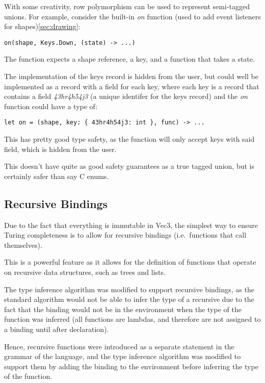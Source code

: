 With some creativity, row polymorphism can be used to represent semi-tagged unions.
For example, consider the built-in \textit{on} function (used to add event listeners for shapes)\ref{sec:drawing}:

\begin{verbatim}
on(shape, Keys.Down, (state) -> ...)
\end{verbatim}

The function expects a shape reference, a key, and a function that takes a state.

The implementation of the keys record is hidden from the user, but could well be implemented as a record with a field
for each key, where each key is a record that contains a field 
\textit{43hr4h54j3} (a unique identifer for the keys record) and the \textit{on} function could have a type of:
\begin{verbatim}
let on = (shape, key: { 43hr4h54j3: int }, func) -> ...
\end{verbatim}

This has pretty good type safety, as the function will only accept keys with said field, which is hidden from the user.

This doesn't have quite as good safety guarantees as a true tagged union, but is certainly safer than say C enums.

\subsection{Recursive Bindings}\label{subsec:recursive-bindings}

Due to the fact that everything is immutable in Vec3, the simplest way to ensure Turing completeness is to allow for 
recursive bindings (i.e.\ functions that call themselves).

This is a powerful feature as it allows for the definition of functions that operate on recursive data structures, such
as trees and lists.

The type inference algorithm was modified to support recursive bindings, as the standard algorithm would not be able to
infer the type of a recursive due to the fact that the binding would not be in the environment when the type of the
function was inferred (all functions are lambdas, and therefore are not assigned to a binding until after declaration).

Hence, recursive functions were introduced as a separate statement in the grammar of the language, and the type
inference algorithm was modified to support them by adding the binding to the environment before inferring the type of
the function.

